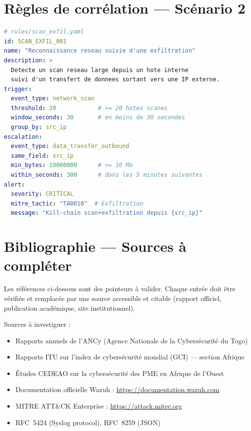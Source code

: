 \documentclass[11pt,a4paper]{article}
\begin{document}
\section{Règles de corrélation — Scénario 2}

\begin{lstlisting}[language=YAML, caption={Règle YAML — Scénario 2 : scan → exfiltration}]
# rules/scan_exfil.yaml
id: SCAN_EXFIL_001
name: "Reconnaissance reseau suivie d'une exfiltration"
description: >
  Detecte un scan reseau large depuis un hote interne
  suivi d'un transfert de donnees sortant vers une IP externe.
trigger:
  event_type: network_scan
  threshold: 20            # >= 20 hotes scanes
  window_seconds: 30       # en moins de 30 secondes
  group_by: src_ip
escalation:
  event_type: data_transfer_outbound
  same_field: src_ip
  min_bytes: 10000000      # >= 10 Mo
  within_seconds: 300      # dans les 5 minutes suivantes
alert:
  severity: CRITICAL
  mitre_tactic: "TA0010"  # Exfiltration
  message: "Kill-chain scan+exfiltration depuis {src_ip}"
\end{lstlisting}

\section{Bibliographie — Sources à compléter}

\begin{warningbox}[title={Sources à vérifier et compléter avant le rapport final}]
Les références ci-dessous sont des pointeurs à valider.
Chaque entrée doit être vérifiée et remplacée par une source accessible
et citable (rapport officiel, publication académique, site institutionnel).
\end{warningbox}

Sources à investiguer :
\begin{itemize}
  \item Rapports annuels de l'ANCy (Agence Nationale de la Cybersécurité du Togo)
  \item Rapports ITU sur l'index de cybersécurité mondial (GCI) — section Afrique
  \item Études CEDEAO sur la cybersécurité des PME en Afrique de l'Ouest
  \item Documentation officielle Wazuh : \url{https://documentation.wazuh.com}
  \item MITRE ATT\&CK Enterprise : \url{https://attack.mitre.org}
  \item RFC~5424 (Syslog protocol), RFC~8259 (JSON)
\end{itemize}
\end{document}
